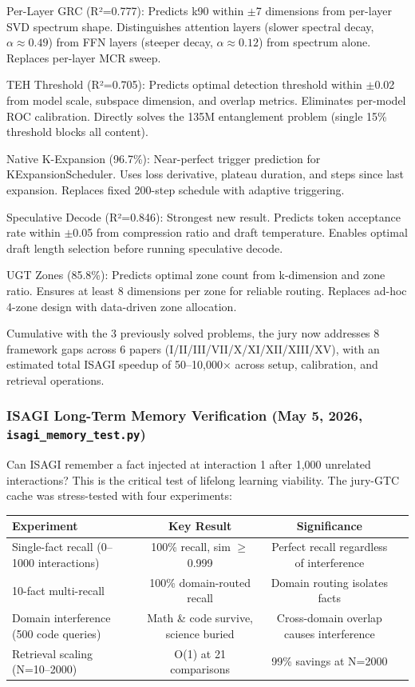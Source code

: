 \documentclass[11pt]{article}
\begin{document}
Per-Layer GRC (R²=0.777): Predicts k90 within $\pm$7 dimensions from per-layer SVD spectrum shape. Distinguishes attention layers (slower spectral decay, $\alpha \approx 0.49$) from FFN layers (steeper decay, $\alpha \approx 0.12$) from spectrum alone. Replaces per-layer MCR sweep.

TEH Threshold (R²=0.705): Predicts optimal detection threshold within $\pm$0.02 from model scale, subspace dimension, and overlap metrics. Eliminates per-model ROC calibration. Directly solves the 135M entanglement problem (single 15\% threshold blocks all content).

Native K-Expansion (96.7\%): Near-perfect trigger prediction for KExpansionScheduler. Uses loss derivative, plateau duration, and steps since last expansion. Replaces fixed 200-step schedule with adaptive triggering.

Speculative Decode (R²=0.846): Strongest new result. Predicts token acceptance rate within $\pm$0.05 from compression ratio and draft temperature. Enables optimal draft length selection before running speculative decode.

UGT Zones (85.8\%): Predicts optimal zone count from k-dimension and zone ratio. Ensures at least 8 dimensions per zone for reliable routing. Replaces ad-hoc 4-zone design with data-driven zone allocation.

Cumulative with the 3 previously solved problems, the jury now addresses 8 framework gaps across 6 papers (I/II/III/VII/X/XI/XII/XIII/XV), with an estimated total ISAGI speedup of 50--10,000$\times$ across setup, calibration, and retrieval operations.

\subsubsection*{ISAGI Long-Term Memory Verification (May 5, 2026, \texttt{isagi\_memory\_test.py})}

Can ISAGI remember a fact injected at interaction 1 after 1,000 unrelated interactions? This is the critical test of lifelong learning viability. The jury-GTC cache was stress-tested with four experiments:

\begin{center}
\begin{tabular}{lccc}
\toprule
Experiment & Key Result & Significance \\
\midrule
Single-fact recall (0--1000 interactions) & 100\% recall, sim $\ge$ 0.999 & Perfect recall regardless of interference \\
10-fact multi-recall & 100\% domain-routed recall & Domain routing isolates facts \\
Domain interference (500 code queries) & Math \& code survive, science buried & Cross-domain overlap causes interference \\
Retrieval scaling (N=10--2000) & O(1) at 21 comparisons & 99\% savings at N=2000 \\
\bottomrule
\end{tabular}
\end{center}
\end{document}
